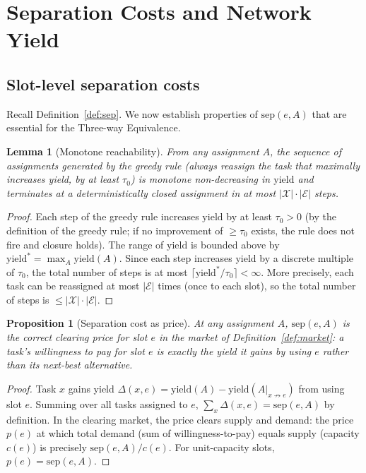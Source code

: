 \documentclass[11pt,twocolumn,a4paper]{article}
\theoremstyle{plain}
\newtheorem{lemma}[theorem]{Lemma}
\newtheorem{proposition}[theorem]{Proposition}
\theoremstyle{definition}
\theoremstyle{remark}
\newcommand{\E}{\mathcal{E}}
\newcommand{\X}{\mathcal{X}}
\newcommand{\tick}{\tau_0}
\newcommand{\sep}{\mathrm{sep}}
\newcommand{\yield}{\mathrm{yield}}
\begin{document}
\section{Separation Costs and Network Yield}
\label{sec:separation}

\subsection{Slot-level separation costs}

Recall Definition~\ref{def:sep}. We now establish properties of $\sep(e, A)$ that are essential for the Three-way Equivalence.

\begin{lemma}[Monotone reachability]
\label{lem:reach}
From any assignment $A$, the sequence of assignments generated by the greedy rule (always reassign the task that maximally increases yield, by at least $\tick$) is monotone non-decreasing in $\yield$ and terminates at a deterministically closed assignment in at most $|\X| \cdot |\E|$ steps.
\end{lemma}

\begin{proof}
Each step of the greedy rule increases $\yield$ by at least $\tick > 0$ (by the definition of the greedy rule; if no improvement of $\geq \tick$ exists, the rule does not fire and closure holds). The range of $\yield$ is bounded above by $\yield^* = \max_A \yield(A)$. Since each step increases yield by a discrete multiple of $\tick$, the total number of steps is at most $\lceil \yield^*/\tick \rceil < \infty$. More precisely, each task can be reassigned at most $|\E|$ times (once to each slot), so the total number of steps is $\leq |\X| \cdot |\E|$.
\end{proof}

\begin{proposition}[Separation cost as price]
\label{prop:sepcost}
At any assignment $A$, $\sep(e, A)$ is the correct clearing price for slot $e$ in the market of Definition~\ref{def:market}: a task's willingness to pay for slot $e$ is exactly the yield it gains by using $e$ rather than its next-best alternative.
\end{proposition}

\begin{proof}
Task $x$ gains yield $\Delta(x, e) = \yield(A) - \yield(A|_{x \not\to e})$ from using slot $e$. Summing over all tasks assigned to $e$, $\sum_x \Delta(x, e) = \sep(e, A)$ by definition. In the clearing market, the price clears supply and demand: the price $p(e)$ at which total demand (sum of willingness-to-pay) equals supply (capacity $c(e)$) is precisely $\sep(e, A)/c(e)$. For unit-capacity slots, $p(e) = \sep(e, A)$.
\end{proof}
\end{document}
